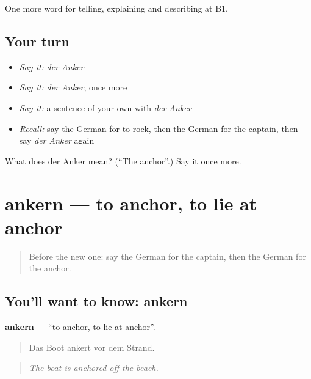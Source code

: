\begin{grammarlens}[title={What you've built}]
One more word for telling, explaining and describing at B1.
\end{grammarlens}

\subsection*{Your turn}
\begin{itemize}
\raggedright
  \item \emph{Say it:} \emph{der Anker}
  \item \emph{Say it:} \emph{der Anker}, once more
  \item \emph{Say it:} a sentence of your own with \emph{der Anker}
  \item \emph{Recall:} say the German for to rock, then the German for the captain, then say \emph{der Anker} again
\end{itemize}

\begin{tcolorbox}[breakable,colback=teal!4,colframe=teal!35!black,title={Before you move on}]
What does der Anker mean? (\textquotedblleft{}The anchor\textquotedblright{}.) Say it once more.
\end{tcolorbox}
\section[ankern]{ankern — to anchor, to lie at anchor}

\label{lesson:GE-C423-ankern}



\begin{quote}
Before the new one: say the German for the captain, then the German for the anchor.
\end{quote}

\subsection*{You'll want to know: ankern}
\textbf{ankern} — \textquotedblleft{}to anchor, to lie at anchor\textquotedblright{}.

\begin{quote}
Das Boot ankert vor dem Strand.
\end{quote}

\begin{quote}
\emph{The boat is anchored off the beach.}
\end{quote}

